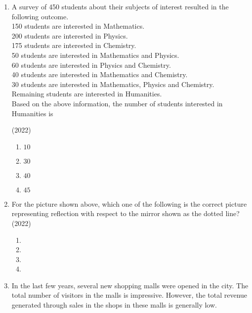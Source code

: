 \documentclass[journal]{IEEEtran}
\begin{document}
\begin{enumerate}
\item A survey of 450 students about their subjects of interest resulted in the
following outcome.\\

150 students are interested in Mathematics.\\
200 students are interested in Physics.\\
175 students are interested in Chemistry.\\
50 students are interested in Mathematics and Physics.\\
60 students are interested in Physics and Chemistry.\\
40 students are interested in Mathematics and Chemistry.\\
30 students are interested in Mathematics, Physics and Chemistry.\\
Remaining students are interested in Humanities.\\

Based on the above information, the number of students interested in
Humanities is

\hfill(2022)
\begin{multicols}{2}
\begin{enumerate}
\item $10$
\item $30$
\item $40$
\item $45$
\end{enumerate}
\end{multicols}


\item 

For the picture shown above, which one of the following is the correct picture
representing reflection with respect to the mirror shown as the dotted line? \hfill(2022)
\begin{multicols}{2}
\begin{enumerate}
\item 
\item 
\item 
\item 
\end{enumerate}
\end{multicols}


\item In the last few years, several new shopping malls were opened in the city. The
total number of visitors in the malls is impressive. However, the total revenue
generated through sales in the shops in these malls is generally low.\\


\end{enumerate}
\end{document}
